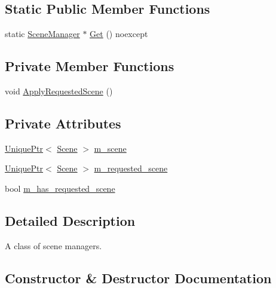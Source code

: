 \subsection*{Static Public Member Functions}
\begin{DoxyCompactItemize}
\item 
static \hyperlink{classmage_1_1_scene_manager}{Scene\+Manager} $\ast$ \hyperlink{classmage_1_1_scene_manager_a282dbbea100d7de48c0b0876619db5e7}{Get} () noexcept
\end{DoxyCompactItemize}
\subsection*{Private Member Functions}
\begin{DoxyCompactItemize}
\item 
void \hyperlink{classmage_1_1_scene_manager_adadc65dc4bd9643c1befd261903309f7}{Apply\+Requested\+Scene} ()
\end{DoxyCompactItemize}
\subsection*{Private Attributes}
\begin{DoxyCompactItemize}
\item 
\hyperlink{namespacemage_a3316d7143a973e37adf1110f2e80ca31}{Unique\+Ptr}$<$ \hyperlink{classmage_1_1_scene}{Scene} $>$ \hyperlink{classmage_1_1_scene_manager_a774c610dba3ece25acf97915b6368a1a}{m\+\_\+scene}
\item 
\hyperlink{namespacemage_a3316d7143a973e37adf1110f2e80ca31}{Unique\+Ptr}$<$ \hyperlink{classmage_1_1_scene}{Scene} $>$ \hyperlink{classmage_1_1_scene_manager_a74bdb7b0805208b039991e9b9abc741f}{m\+\_\+requested\+\_\+scene}
\item 
bool \hyperlink{classmage_1_1_scene_manager_aff9889d9fc53a3524b0e88d10cd544d6}{m\+\_\+has\+\_\+requested\+\_\+scene}
\end{DoxyCompactItemize}


\subsection{Detailed Description}
A class of scene managers. 

\subsection{Constructor \& Destructor Documentation}
\hypertarget{classmage_1_1_scene_manager_a25a1185ca41db52d046a5901b301a0be}{}\label{classmage_1_1_scene_manager_a25a1185ca41db52d046a5901b301a0be} 
